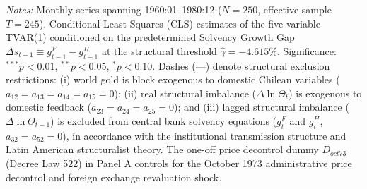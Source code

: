 \begin{table}[htbp]
{\begin{tabular}{lccccc}
\bottomrule
\end{tabular}%
}
\begin{minipage}{\textwidth}
\vspace{0.4em}
\footnotesize \textit{Notes:} Monthly series spanning 1960:01--1980:12 ($N=250$, effective sample $T=245$). Conditional Least Squares (CLS) estimates of the five-variable TVAR(1) conditioned on the predetermined Solvency Growth Gap $\Delta s_{t-1} \equiv g^F_{t-1} - g^H_{t-1}$ at the structural threshold $\hat{\gamma} = -4.615\%$. Significance: $^{***} p < 0.01$, $^{**} p < 0.05$, $^{*} p < 0.10$. Dashes (---) denote structural exclusion restrictions: (i) world gold is block exogenous to domestic Chilean variables ($a_{12} = a_{13} = a_{14} = a_{15} = 0$); (ii) real structural imbalance ($\Delta \ln \Theta_t$) is exogenous to domestic feedback ($a_{23} = a_{24} = a_{25} = 0$); and (iii) lagged structural imbalance ($\Delta \ln \Theta_{t-1}$) is excluded from central bank solvency equations ($g^F_t$ and $g^H_t$, $a_{32} = a_{52} = 0$), in accordance with the institutional transmission structure and Latin American structuralist theory. The one-off price decontrol dummy $D_{oct73}$ (Decree Law 522) in Panel A controls for the October 1973 administrative price decontrol and foreign exchange revaluation shock.
\end{minipage}
\end{table}
